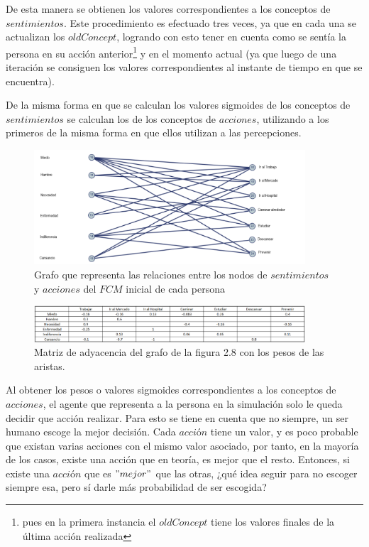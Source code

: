 De esta manera se obtienen los valores correspondientes a los conceptos de $sentimientos$. Este procedimiento
es efectuado tres veces, ya que en cada una se actualizan los $oldConcept$, logrando con esto tener en 
cuenta como se sentía la persona en su acción anterior\footnote{pues en la primera instancia el $oldConcept$
tiene los valores finales de la última acción realizada} y en el momento actual (ya que luego de una iteración
se consiguen los valores correspondientes al instante de tiempo en que se encuentra).

De la misma forma en que se calculan los valores sigmoides de los conceptos de $sentimientos$ se 
calculan los de los conceptos de $acciones$, utilizando a los primeros de la misma forma en que ellos
utilizan a las percepciones.
\begin{figure}[htb]
    \centering
    \includegraphics[width=0.9\textwidth]{Graphics/Grafo_Sent-Acciones.png}
    \caption{Grafo que representa las relaciones entre los nodos de $sentimientos$ y $acciones$ del $FCM$ inicial de cada persona}
\end{figure}

\begin{figure}[htb]
    \centering
    \includegraphics[width=0.9\textwidth]{Graphics/Pesos_Sen_acc.png}
    \caption{Matriz de adyacencia del grafo de la figura 2.8 con los pesos de las aristas.}
\end{figure}

Al obtener los pesos o valores sigmoides correspondientes a los conceptos de $acciones$, el agente que 
representa a la persona en la simulación solo le queda decidir que acción realizar. Para esto se tiene en 
cuenta que no siempre, un ser humano escoge la mejor decisión. Cada $acci$ó$n$ tiene un valor, y es poco
probable que existan varias acciones con el mismo valor asociado, por tanto, en la mayoría de los casos,
existe una acción que en teoría, es mejor que el resto. Entonces, si existe una $acci$ó$n$ que es $"mejor"$
que las otras, ¿qué idea seguir para no escoger siempre esa, pero sí darle más probabilidad de ser escogida?

